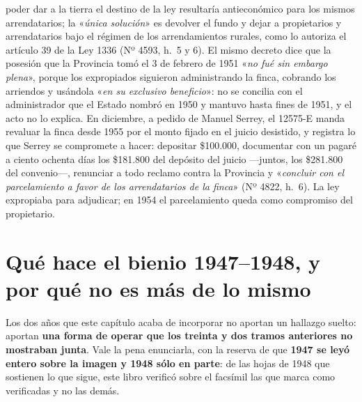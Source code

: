 \begin{cautela}
poder dar a la tierra el destino de la ley resultaría antieconómico para los mismos arrendatarios; la «\textit{única solución}» es devolver el fundo y dejar a propietarios y arrendatarios bajo el régimen de los arrendamientos rurales, como lo autoriza el artículo 39 de la Ley 1336 (Nº 4593, h.\ 5 y 6). El mismo decreto dice que la posesión que la Provincia tomó el 3 de febrero de 1951 «\textit{no fué sin embargo plena}», porque los expropiados siguieron administrando la finca, cobrando los arriendos y usándola «\textit{en su exclusivo beneficio}»: no se concilia con el administrador que el Estado nombró en 1950 y mantuvo hasta fines de 1951, y el acto no lo explica. En diciembre, a pedido de Manuel Serrey, el 12575-E manda revaluar la finca desde 1955 por el monto fijado en el juicio desistido, y registra lo que Serrey se compromete a hacer: depositar \$100.000, documentar con un pagaré a ciento ochenta días los \$181.800 del depósito del juicio ---juntos, los \$281.800 del convenio---, renunciar a todo reclamo contra la Provincia y «\textit{concluir con el parcelamiento a favor de los arrendatarios de la finca}» (Nº 4822, h.\ 6). La ley expropiaba para adjudicar; en 1954 el parcelamiento queda como compromiso del propietario.
\end{cautela}

\section{Qué hace el bienio 1947--1948, y por qué no es más de lo mismo}

Los dos años que este capítulo acaba de incorporar no aportan un hallazgo suelto: aportan
\textbf{una forma de operar que los treinta y dos tramos anteriores no mostraban junta}. Vale
la pena enunciarla, con la reserva de que \textbf{1947 se leyó entero sobre la imagen y 1948 sólo en
parte}: de las hojas de 1948 que sostienen lo que sigue, este libro verificó sobre el facsímil las que
marca como verificadas y no las demás.

